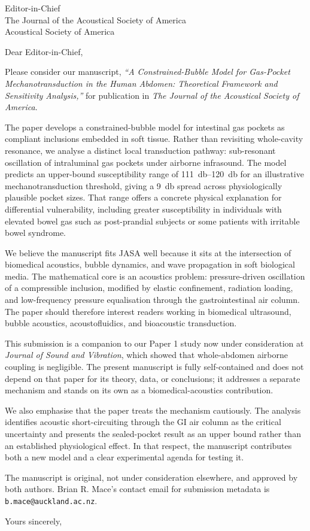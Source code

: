 \documentclass[11pt]{letter}
\date{\today}
\begin{document}
\begin{letter}{%
Editor-in-Chief\\
The Journal of the Acoustical Society of America\\
Acoustical Society of America}

\opening{Dear Editor-in-Chief,}

Please consider our manuscript, \emph{``A Constrained-Bubble Model for Gas-Pocket Mechanotransduction in the Human Abdomen: Theoretical Framework and Sensitivity Analysis,''} for publication in \emph{The Journal of the Acoustical Society of America}.

The paper develops a constrained-bubble model for intestinal gas pockets as compliant inclusions embedded in soft tissue. Rather than revisiting whole-cavity resonance, we analyse a distinct local transduction pathway: sub-resonant oscillation of intraluminal gas pockets under airborne infrasound. The model predicts an upper-bound susceptibility range of \SIrange{111}{120}{\decibel} for an illustrative mechanotransduction threshold, giving a \SI{9}{\decibel} spread across physiologically plausible pocket sizes. That range offers a concrete physical explanation for differential vulnerability, including greater susceptibility in individuals with elevated bowel gas such as post-prandial subjects or some patients with irritable bowel syndrome.

We believe the manuscript fits JASA well because it sits at the intersection of biomedical acoustics, bubble dynamics, and wave propagation in soft biological media. The mathematical core is an acoustics problem: pressure-driven oscillation of a compressible inclusion, modified by elastic confinement, radiation loading, and low-frequency pressure equalisation through the gastrointestinal air column. The paper should therefore interest readers working in biomedical ultrasound, bubble acoustics, acoustofluidics, and bioacoustic transduction.

This submission is a companion to our Paper 1 study now under consideration at \emph{Journal of Sound and Vibration}, which showed that whole-abdomen airborne coupling is negligible. The present manuscript is fully self-contained and does not depend on that paper for its theory, data, or conclusions; it addresses a separate mechanism and stands on its own as a biomedical-acoustics contribution.

We also emphasise that the paper treats the mechanism cautiously. The analysis identifies acoustic short-circuiting through the GI air column as the critical uncertainty and presents the sealed-pocket result as an upper bound rather than an established physiological effect. In that respect, the manuscript contributes both a new model and a clear experimental agenda for testing it.

The manuscript is original, not under consideration elsewhere, and approved by both authors. Brian R. Mace's contact email for submission metadata is \texttt{b.mace@auckland.ac.nz}.

\closing{Yours sincerely,}

\end{letter}
\end{document}

